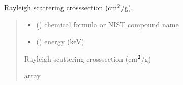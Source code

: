 \documentclass[letterpaper,10pt,english,openany,oneside]{sphinxmanual}
\begin{document}
\begin{fulllineitems}
\label{\detokenize{api/cross_sections:dxraylib.CS_Rayl_CP}}
\pysigstartsignatures
{}
\pysigstopsignatures
\sphinxAtStartPar
Rayleigh scattering cross\sphinxhyphen{}section (cm\(\sp{\text{2}}\)/g).
\begin{quote}\begin{description}
\begin{itemize}
\item {} 
\sphinxAtStartPar
{} () \textendash{} chemical formula or NIST compound name

\item {} 
\sphinxAtStartPar
{} () \textendash{} energy (keV)

\end{itemize}

\sphinxAtStartPar
Rayleigh scattering cross\sphinxhyphen{}section (cm\(\sp{\text{2}}\)/g)

\sphinxAtStartPar
array

\end{description}\end{quote}

\end{fulllineitems}


\begin{DUlineblock}{0em}
\item[] 
\end{DUlineblock}
\end{document}
